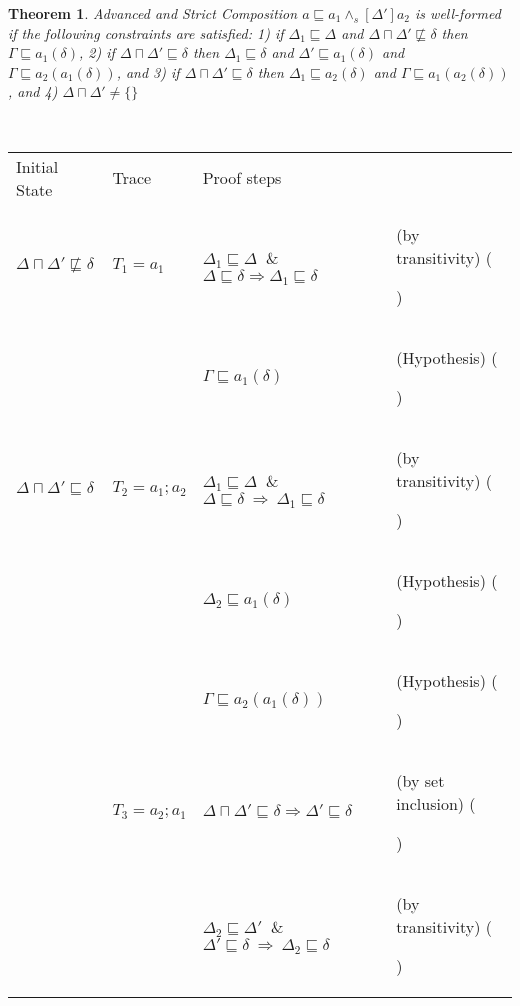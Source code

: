 \documentclass[12pt,journal,letterpaper,onecolumn]{IEEEtran}
\newcounter{myCounter}
\renewcommand{\themyCounter}{\arabic{myCounter}\addtocounter{myCounter}{1}}
\newtheorem{theorem}{Theorem}[section]
\begin{document}
\begin{theorem}
Advanced and Strict Composition $a\sqsubseteq
a_1\wedge_s[\Delta']a_2$ is well-formed if the following constraints
are satisfied: 1) if $\Delta_1 \sqsubseteq \Delta$ and $\Delta
\sqcap \Delta' \not \sqsubseteq \delta$ then
 $\Gamma \sqsubseteq a_1(\delta)$,
2) if $\Delta \sqcap \Delta' \sqsubseteq \delta$ then
  $\Delta_1 \sqsubseteq \delta$ and $\Delta' \sqsubseteq
  a_1(\delta)$ and $\Gamma \sqsubseteq a_2(a_1(\delta))$, and
3) if $\Delta \sqcap \Delta' \sqsubseteq \delta$ then
 $\Delta_1 \sqsubseteq a_2(\delta)$ and $\Gamma \sqsubseteq
 a_1(a_2(\delta))$, and 4) $\Delta \sqcap
\Delta' \neq \{\}$\\
\label{theorem:advancedstrict} \end{theorem}
\\
\begin{minipage}{6in} \begin{center}
\begin{tabular}{llp{7.5cm}p{3.8cm}}
Initial State & Trace &  Proof steps & \\

$\Delta \sqcap \Delta' \not \sqsubseteq \delta$ & $T_1 = a_1$ &
$\Delta_1 \sqsubseteq \Delta $ $~\&~$ $ \Delta \sqsubseteq \delta
\Rightarrow \Delta_1 \sqsubseteq \delta$ &
(by transitivity) \hfill(\themyCounter)  \\

& & $\Gamma \sqsubseteq a_1(\delta)$ & (Hypothesis) \hfill(\themyCounter)  \\


$\Delta \sqcap \Delta' \sqsubseteq \delta$ & $T_2 = a_1;a_2$ &
$\Delta_1 \sqsubseteq \Delta $ $~\&~$ $ \Delta \sqsubseteq \delta
~\Rightarrow~
\Delta_1 \sqsubseteq \delta$ & (by transitivity) \hfill(\themyCounter) \\

& & $\Delta_2 \sqsubseteq a_1(\delta)$ & (Hypothesis)  \hfill(\themyCounter)\\

& & $\Gamma \sqsubseteq a_2(a_1(\delta))$ & (Hypothesis)  \hfill(\themyCounter)\\

& $T_3 = a_2;a_1$ & $\Delta \sqcap \Delta' \sqsubseteq \delta
\Rightarrow \Delta' \sqsubseteq \delta$ &  (by set inclusion)  \hfill(\themyCounter)\\

& & $ \Delta_2 \sqsubseteq \Delta' $ $~\&~$ $ \Delta' \sqsubseteq
\delta ~\Rightarrow~ \Delta_2 \sqsubseteq \delta$ &   (by transitivity) \hfill(\themyCounter)\\


\end{tabular}
\end{center}
\end{minipage}
\end{document}
